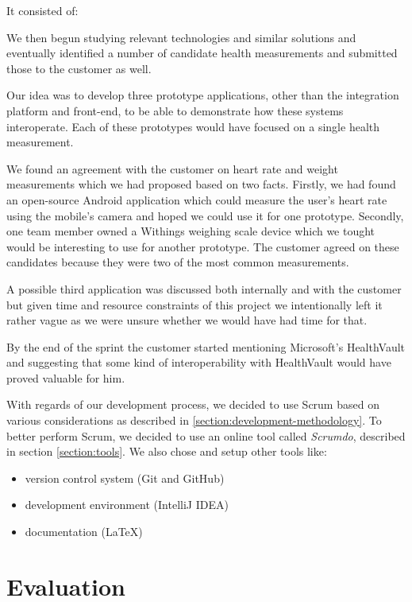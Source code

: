 It consisted of:
\begin{enumerate}[1.]
\end{enumerate}

We then begun studying relevant technologies and similar solutions and eventually identified
a number of candidate health measurements and submitted those to the customer as well.

Our idea was to develop three prototype applications, other than the integration
platform and front-end, to be able to demonstrate how these systems interoperate.
Each of these prototypes would have focused on a single health measurement.

We found an agreement with the customer on heart rate and weight measurements which we had
proposed based on two facts. Firstly, we had found an open-source Android application which could
measure the user's heart rate using the mobile's camera and hoped we could use it for one prototype.
Secondly, one team member owned a Withings weighing scale device which we tought
would be interesting to use for another prototype.
The customer agreed on these candidates because they were two of the most common measurements.

A possible third application was discussed both internally and with the customer but
given time and resource constraints of this project we intentionally left it rather vague
as we were unsure whether we would have had time for that.

By the end of the sprint the customer started mentioning Microsoft's HealthVault and suggesting
that some kind of interoperability with HealthVault would have proved valuable for him.

With regards of our development process, we decided to use Scrum based on various considerations as
described in \ref{section:development-methodology}. To better perform Scrum, we decided
to use an online tool called \textit{Scrumdo}, described in section \ref{section:tools}.
We also chose and setup other tools like:
\begin{itemize}
\item version control system (Git and GitHub)
\item development environment (IntelliJ IDEA)
\item documentation (LaTeX)
\end{itemize}

\section{Evaluation}

